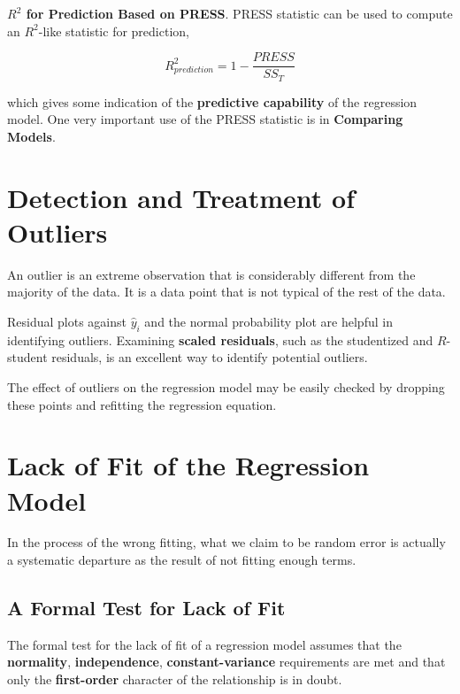 \documentclass[12pt]{article}
\begin{document}
\textbf{$R^2$ for Prediction Based on PRESS}. PRESS statistic can be used to compute an $R^2$-like statistic for prediction, 

$$
R^2_{prediction} = 1 - \frac{PRESS}{SS_T}
$$

which gives some indication of the \textbf{predictive capability} of the regression model. One very important use of the PRESS statistic is in \textbf{Comparing Models}. 


\section{Detection and Treatment of Outliers}

An outlier is an extreme observation that is considerably different from the majority of the data. It is a data point that is not typical of the rest of the data. 

Residual plots against $\hat{y}_i$ and the normal probability plot are helpful in identifying outliers. Examining \textbf{scaled residuals}, such as the studentized and $R$-student residuals, is an excellent way to identify potential outliers. 

The effect of outliers on the regression model may be easily checked by dropping these points and refitting the regression equation. 



\section{Lack of Fit of the Regression Model}

In the process of the wrong fitting, what we claim to be random error is actually a systematic departure as the result of not fitting enough terms. 

\subsection{A Formal Test for Lack of Fit}

The formal test for the lack of fit of a regression model assumes that the \textbf{normality}, \textbf{independence}, \textbf{constant-variance} requirements are met and that only the \textbf{first-order} character of the relationship is in doubt. 
\end{document}
